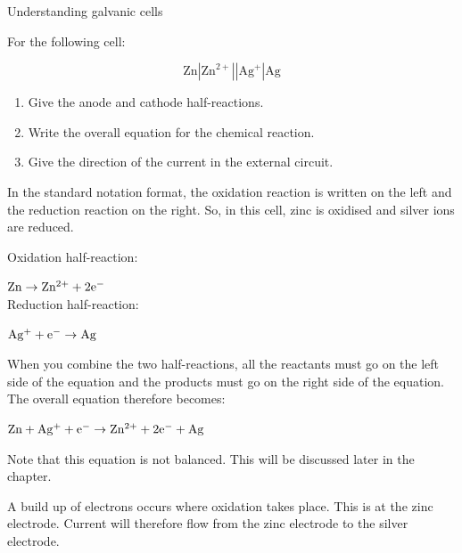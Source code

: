 \begin{wex}{Understanding galvanic cells\\}{
For the following cell:
\begin{center}
\begin{equation*}
\text{Zn}|\text{Zn}^{2+}||\text{Ag}^{+}|\text{Ag}
\end{equation*}
\end{center}
\begin{enumerate}
\item{Give the anode and cathode half-reactions.}
\item{Write the overall equation for the chemical reaction.}
\item{Give the direction of the current in the external circuit.}
\end{enumerate}
}

{

In the standard notation format, the oxidation reaction is written on the left and the reduction reaction on the right. So, in this cell, zinc is oxidised and silver ions are reduced.\\

Oxidation half-reaction:

$\rm{Zn \rightarrow Zn^{2+} + 2e^{-}}$\\

Reduction half-reaction:

$\rm{Ag^{+} + e^{-} \rightarrow Ag}$\\

When you combine the two half-reactions, all the reactants must go on the left side of the equation and the products must go on the right side of the equation. The overall equation therefore becomes:

\begin{center}
$\rm{Zn + Ag^{+} + e^{-} \rightarrow Zn^{2+} + 2e^{-} + Ag}$
\end{center}

Note that this equation is not balanced. This will be discussed later in the chapter.\\

A build up of electrons occurs where oxidation takes place. This is at the zinc electrode. Current will therefore flow from the zinc electrode to the silver electrode.
}
\end{wex}

